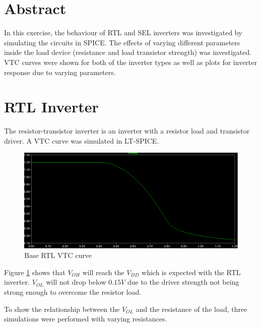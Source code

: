 \documentclass[CMPE]{../KGCOEReport}
\begin{document}
    \maketitle
    \section*{Abstract}

    In this exercise, the behaviour of RTL and SEL inverters was investigated by
    simulating the circuits in SPICE. The effects of varying different parameters
    inside the load device (resistance and load transistor strength) was investigated.
    VTC curves were shown for both of the inverter types as well as plots for inverter
    response due to varying parameters. \\

    \section*{RTL Inverter}

     The resistor-transistor inverter is an inverter with a resistor load and
     transistor driver. A VTC curve was simulated in LT-SPICE.
     
     \begin{figure}[h!]
     	\centering
       \includegraphics[width=5.5in]{img/rtl_vtc}
       \caption{Base RTL VTC curve}
       \label{fig:rtl_vtc}
	 \end{figure}

	Figure \ref{fig:rtl_vtc} shows that $V_{OH}$ will reach the $V_{DD}$ which
	is expected with the RTL inverter. $V_{OL}$ will not drop below $0.15V$ due
	to the driver strength not being strong enough to overcome the resistor load.

	To show the relationship between the $V_{OL}$ and the resistance of the load,
	three simulations were performed with varying resistances.
\end{document}

